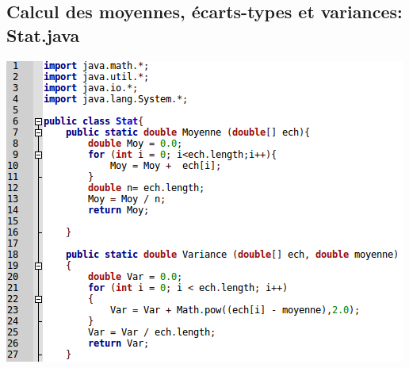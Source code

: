 \documentclass[a4paper, 11pt]{article}
\begin{document}
%    
%
    
    \subsection{Calcul des moyennes, écarts-types et variances: Stat.java}
    \vspace{2\baselineskip}
    \label{stat1}
  	\begin{center}
        \includegraphics[scale=0.9, angle=90]{./img/Stat1.png}
    \end{center}
    \vspace{2\baselineskip}
    \clearpage
    
\end{document}
